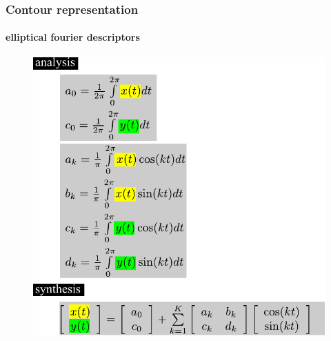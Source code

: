 



\begin{frame}
\frametitle{Contour representation}
\framesubtitle{elliptical fourier descriptors}
\logoCSIPCPL\mypagenum
	\begin{figure}
		\includegraphics[height=0.8\textheight]{figs/theory_curves_ellipticalFourier.pdf}
	\end{figure}
\end{frame}






